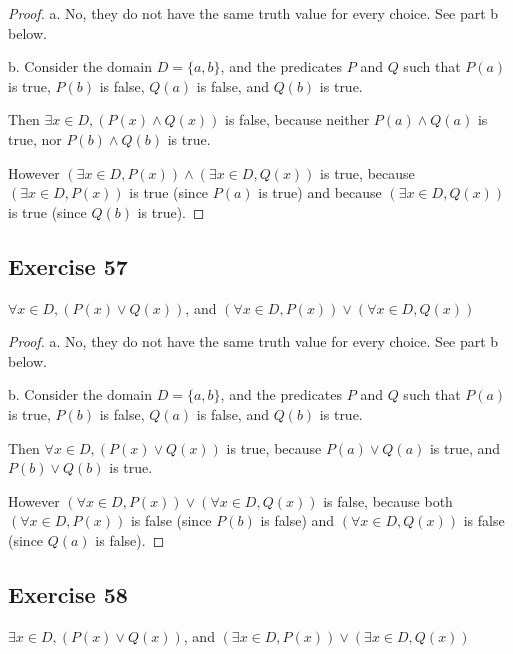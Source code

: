 \documentclass[14pt]{extarticle}
\newcommand{\fa}{\forall}
\newcommand{\te}{\exists}
\begin{document}
\begin{proof}
    a. No, they do not have the same truth value for every choice. See part b below.

    b. Consider the domain $D = \{a, b\}$, and the predicates $P$ and $Q$ such that $P(a)$ is true, $P(b)$ is false, $Q(a)$ is false, and $Q(b)$ is true.

    Then $\te x \in D, (P(x) \wedge Q(x))$ is false, because neither $P(a) \wedge Q(a)$ is true, nor $P(b) \wedge Q(b)$ is true.

    However $(\te x \in D, P(x)) \wedge (\te x \in D, Q(x))$ is true, because $(\te x \in D, P(x))$ is true (since $P(a)$ is true) and because $(\te x \in D, Q(x))$ is true (since $Q(b)$ is true).
\end{proof}

\subsection{Exercise 57}
$\fa x \in D, (P(x) \vee Q(x))$, and $(\fa x \in D, P(x)) \vee (\fa x \in D, Q(x))$

\begin{proof}
    a. No, they do not have the same truth value for every choice. See part b below.

    b. Consider the domain $D = \{a, b\}$, and the predicates $P$ and $Q$ such that $P(a)$ is true, $P(b)$ is false, $Q(a)$ is false, and $Q(b)$ is true.

    Then $\fa x \in D, (P(x) \vee Q(x))$ is true, because $P(a) \vee Q(a)$ is true, and $P(b) \vee Q(b)$ is true.

    However $(\fa x \in D, P(x)) \vee (\fa x \in D, Q(x))$ is false, because both $(\fa x \in D, P(x))$ is false (since $P(b)$ is false) and $(\fa x \in D, Q(x))$ is false (since $Q(a)$ is false).
\end{proof}

\subsection{Exercise 58}
$\te x \in D, (P(x) \vee Q(x))$, and $(\te x \in D, P(x)) \vee (\te x \in D, Q(x))$
\end{document}
